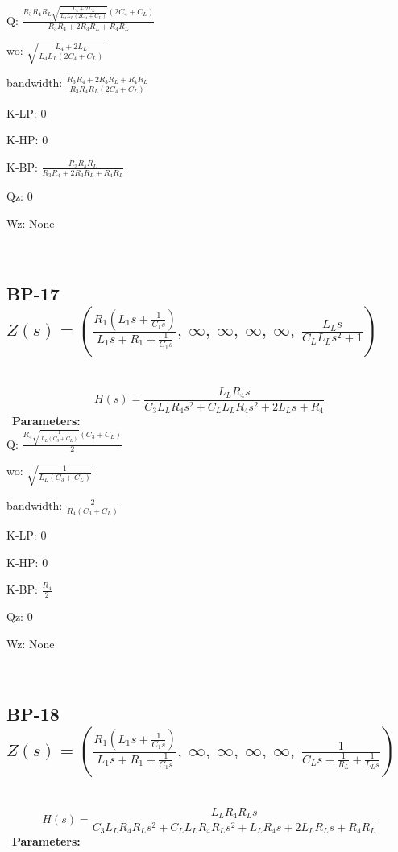 \documentclass{article}
\begin{document}
Q: $\frac{R_{3} R_{4} R_{L} \sqrt{\frac{L_{4} + 2 L_{L}}{L_{4} L_{L} \left(2 C_{4} + C_{L}\right)}} \left(2 C_{4} + C_{L}\right)}{R_{3} R_{4} + 2 R_{3} R_{L} + R_{4} R_{L}}$\ 

wo: $\sqrt{\frac{L_{4} + 2 L_{L}}{L_{4} L_{L} \left(2 C_{4} + C_{L}\right)}}$\ 

bandwidth: $\frac{R_{3} R_{4} + 2 R_{3} R_{L} + R_{4} R_{L}}{R_{3} R_{4} R_{L} \left(2 C_{4} + C_{L}\right)}$\ 

K-LP: $0$\ 

K-HP: $0$\ 

K-BP: $\frac{R_{3} R_{4} R_{L}}{R_{3} R_{4} + 2 R_{3} R_{L} + R_{4} R_{L}}$\ 

Qz: $0$\ 

Wz: $\text{None}$\ 

\ 

\subsection{BP-17 $Z(s) = \left( \frac{R_{1} \left(L_{1} s + \frac{1}{C_{1} s}\right)}{L_{1} s + R_{1} + \frac{1}{C_{1} s}}, \  \infty, \  \infty, \  \infty, \  \infty, \  \frac{L_{L} s}{C_{L} L_{L} s^{2} + 1}\right)$ } \ 
\textbf{\[H(s) = \frac{L_{L} R_{4} s}{C_{3} L_{L} R_{4} s^{2} + C_{L} L_{L} R_{4} s^{2} + 2 L_{L} s + R_{4}}\] } \ 
\textbf{Parameters:}\\ 

Q: $\frac{R_{4} \sqrt{\frac{1}{L_{L} \left(C_{3} + C_{L}\right)}} \left(C_{3} + C_{L}\right)}{2}$\ 

wo: $\sqrt{\frac{1}{L_{L} \left(C_{3} + C_{L}\right)}}$\ 

bandwidth: $\frac{2}{R_{4} \left(C_{3} + C_{L}\right)}$\ 

K-LP: $0$\ 

K-HP: $0$\ 

K-BP: $\frac{R_{4}}{2}$\ 

Qz: $0$\ 

Wz: $\text{None}$\ 

\ 

\subsection{BP-18 $Z(s) = \left( \frac{R_{1} \left(L_{1} s + \frac{1}{C_{1} s}\right)}{L_{1} s + R_{1} + \frac{1}{C_{1} s}}, \  \infty, \  \infty, \  \infty, \  \infty, \  \frac{1}{C_{L} s + \frac{1}{R_{L}} + \frac{1}{L_{L} s}}\right)$ } \ 
\textbf{\[H(s) = \frac{L_{L} R_{4} R_{L} s}{C_{3} L_{L} R_{4} R_{L} s^{2} + C_{L} L_{L} R_{4} R_{L} s^{2} + L_{L} R_{4} s + 2 L_{L} R_{L} s + R_{4} R_{L}}\] } \ 
\textbf{Parameters:}\\ 
\end{document}

